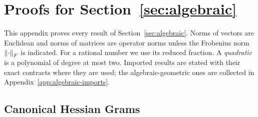 \section{Proofs for Section~\ref{sec:algebraic}}
\label{app:algebraic}

This appendix proves every result of Section~\ref{sec:algebraic}. Norms of
vectors are Euclidean and norms of matrices are operator norms unless the
Frobenius norm $\left\lVert\cdot\right\rVert_F$ is indicated. For a rational number we use its
reduced fraction. A \emph{quadratic} is a polynomial of degree at most two.
Imported results are stated with their exact contracts where they are used;
the algebraic-geometric ones are collected in
Appendix~\ref{app:algebraic-imports}.

\subsection{Canonical Hessian Grams}
\label{app:algebraic-gram}

